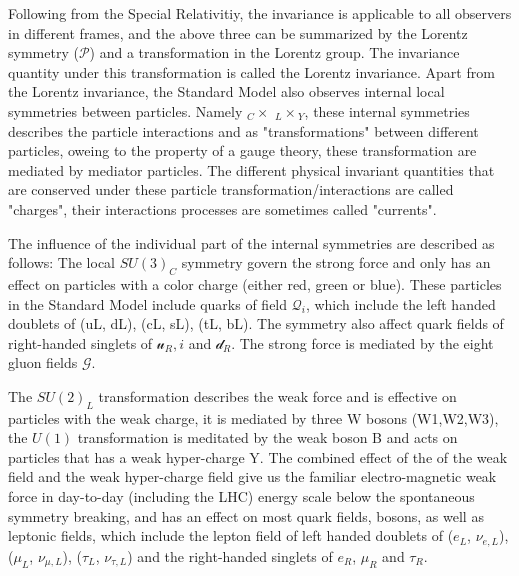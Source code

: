 Following from the Special Relativitiy, the invariance is applicable to all observers in different frames, and the above three can be summarized by the Lorentz symmetry ($\mathcal{P}$) and a transformation in the Lorentz group. The invariance quantity under this transformation is called the Lorentz invariance. 
    Apart from the Lorentz invariance, the Standard Model also observes internal local symmetries between particles. Namely  \SUthree$_C \times $ \SUtwo$_L \times$\Uone$_{Y}$, these internal symmetries describes the particle interactions and as "transformations" between different particles, oweing to the property of a gauge theory, these transformation are mediated by mediator particles. The different physical invariant quantities that are conserved under these particle
    transformation/interactions are called "charges", their interactions processes are sometimes called "currents".

    The influence of the individual part of the internal symmetries are described as follows: The local $SU(3)_{C}$ symmetry govern the strong force and only has an effect on particles with a color charge (either red, green or blue). These particles in the Standard Model include quarks of field $\mathcal{Q}_{i}$, which include the left handed doublets of (uL, dL), (cL, sL), (tL, bL). The symmetry also affect quark fields of right-handed singlets of $\mathcal{u}_R,i$ and $\mathcal{d}_R$. The
    strong force is mediated by the eight gluon fields $\mathcal{G}$.

    The $SU(2)_{L}$ transformation describes the weak force and is effective on particles with the weak charge, it is mediated by three W bosons (W1,W2,W3), the $U(1)$ transformation is meditated by the weak boson B and acts on particles that has a weak hyper-charge Y. The combined effect of the of the weak field and the weak hyper-charge field give us the familiar electro-magnetic weak force in day-to-day (including the LHC) energy scale below the spontaneous symmetry breaking, and has an
effect on most quark fields, bosons, as well as leptonic fields, which include the lepton field of left handed doublets of ($e_{L}$, $\nu_{e,L}$), ($\mu_{L}$, $\nu_{\mu,L}$), ($\tau_{L}$, $\nu_{\tau,L}$) and the right-handed singlets of $e_{R}$, $\mu_{R}$ and $\tau_{R}$.
    

